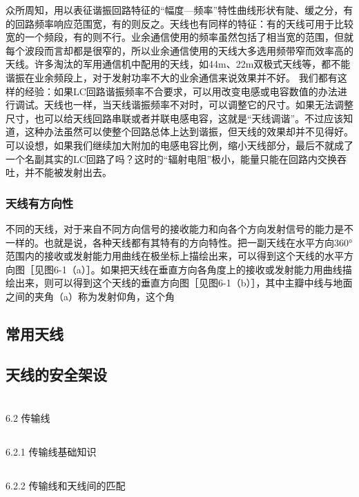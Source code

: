\documentclass[12pt,UTF8]{ctexbook}
\begin{document}
众所周知，用以表征谐振回路特征的“幅度—频率”特性曲线形状有陡、缓之分，有的回路频率响应范围宽，有的则反之。天线也有同样的特征：有的天线可用于比较宽的一个频段，有的则不行。业余通信使用的频率虽然包括了相当宽的范围，但就每个波段而言却都是很窄的，所以业余通信使用的天线大多选用频带窄而效率高的天线。许多淘汰的军用通信机中配用的天线，如44m、22m双极式天线等，都不能谐振在业余频段上，对于发射功率不大的业余通信来说效果并不好。
我们都有这样的经验：如果LC回路谐振频率不合要求，可以用改变电感或电容数值的办法进行调试。天线也一样，当天线谐振频率不对时，可以调整它的尺寸。如果无法调整尺寸，也可以给天线回路串联或者并联电感电容，这就是“天线调谐”。不过应该知道，这种办法虽然可以使整个回路总体上达到谐振，但天线的效果却并不见得好。可以设想，如果我们继续加大附加的电感电容比例，缩小天线部分，最后不就成了一个名副其实的LC回路了吗？这时的“辐射电阻”极小，能量只能在回路内交换吞吐，并不能被发射出去。

\subsubsection{天线有方向性}

不同的天线，对于来自不同方向信号的接收能力和向各个方向发射信号的能力是不一样的。也就是说，各种天线都有其特有的方向特性。把一副天线在水平方向360°范围内的接收或发射能力用曲线在极坐标上描绘出来，可以得到这个天线的水平方向图［见图6-1（a）］。如果把天线在垂直方向各角度上的接收或发射能力用曲线描绘出来，则可以得到这个天线的垂直方向图［见图6-1（b）］，其中主瓣中线与地面之间的夹角（a）称为发射仰角，这个角

\subsection{常用天线}
\subsection{天线的安全架设}



\section{}6.2 传输线
\subsection{}6.2.1 传输线基础知识
\subsection{}6.2.2 传输线和天线间的匹配
\end{document}
